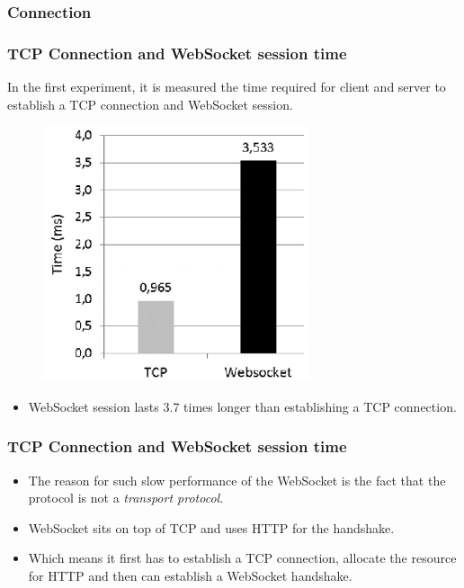 \documentclass{beamer}
\begin{document}
\subsubsection{Connection}
\begin{frame}
    \frametitle{TCP Connection and WebSocket session time}
    In the first experiment, it is measured the time required for client and server to establish a TCP connection and WebSocket session.
    \pause{}
    \begin{figure}
        \includegraphics[width=0.7\textwidth,height=0.5\textheight]{images/data_time_connection.jpeg}
    \end{figure}
    \begin{itemize}
        \item WebSocket session lasts \alert{3.7 times longer} than establishing a TCP
              connection.
    \end{itemize}
\end{frame}

\begin{frame}
    \frametitle{TCP Connection and WebSocket session time}
    \begin{itemize}[<+->]
        \item The reason for such slow performance of the WebSocket is the fact that the
              protocol is not a \textit{transport protocol}.
        \item WebSocket sits on top of TCP and uses HTTP for the handshake.
        \item Which means it first has to establish a TCP connection, allocate the resource
              for HTTP and then can establish a WebSocket handshake. 
    \end{itemize}
\end{frame}
\end{document}

